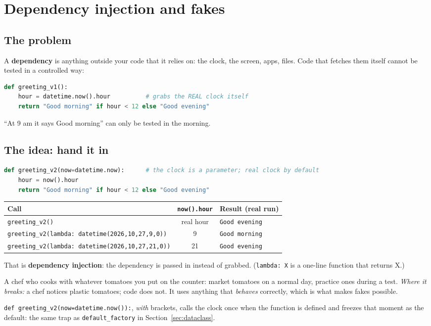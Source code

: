 \documentclass[11pt,a4paper]{article}
\begin{document}
\section{Dependency injection and fakes}\label{sec:di}
\subsection{The problem}
A \textbf{dependency} is anything outside your code that it relies on: the clock, the screen,
apps, files. Code that fetches them itself cannot be tested in a controlled way:
\begin{lstlisting}[language=Python]
def greeting_v1():
    hour = datetime.now().hour          # grabs the REAL clock itself
    return "Good morning" if hour < 12 else "Good evening"
\end{lstlisting}
\noindent ``At 9 am it says Good morning'' can only be tested in the morning.

\subsection{The idea: hand it in}
\begin{lstlisting}[language=Python]
def greeting_v2(now=datetime.now):      # the clock is a parameter; real clock by default
    hour = now().hour
    return "Good morning" if hour < 12 else "Good evening"
\end{lstlisting}
\begin{center}
\begin{tabularx}{\textwidth}{X c l}
\toprule
\textbf{Call} & \textbf{\texttt{now().hour}} & \textbf{Result (real run)} \\
\midrule
\texttt{greeting\_v2()} & real hour & \texttt{Good evening} \\
\texttt{greeting\_v2(lambda: datetime(2026,10,27,9,0))} & 9 & \texttt{Good morning} \\
\texttt{greeting\_v2(lambda: datetime(2026,10,27,21,0))} & 21 & \texttt{Good evening} \\
\bottomrule
\end{tabularx}
\end{center}
\noindent That is \textbf{dependency injection}: the dependency is passed in instead of grabbed.
(\texttt{lambda: X} is a one-line function that returns X.)

\begin{analogy}
A chef who cooks with whatever tomatoes you put on the counter: market tomatoes on a normal day,
practice ones during a test. \emph{Where it breaks:} a chef notices plastic tomatoes; code does not.
It uses anything that \emph{behaves} correctly, which is what makes fakes possible.
\end{analogy}
\begin{caution}
\texttt{def greeting\_v2(now=datetime.now()):}, \emph{with} brackets, calls the clock once when the
function is defined and freezes that moment as the default: the same trap as
\texttt{default\_factory} in Section~\ref{sec:dataclass}.
\end{caution}
\end{document}
